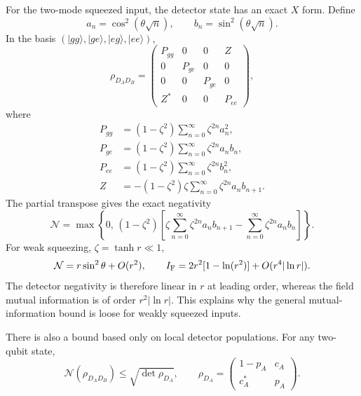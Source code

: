 \documentclass[pdflatex,sn-mathphys-num]{sn-jnl}
\begin{document}
For the two-mode squeezed input, the detector state has an exact $X$ form. Define
\begin{equation}
a_n=\cos^2(\theta\sqrt n),\qquad b_n=\sin^2(\theta\sqrt n).
\label{eq:jc-ab-definitions}
\end{equation}
In the basis $(|gg\rangle,|ge\rangle,|eg\rangle,|ee\rangle)$,
\begin{equation}
\rho_{D_AD_B}=
\begin{pmatrix}
P_{gg}&0&0&Z\\
0&P_{ge}&0&0\\
0&0&P_{ge}&0\\
Z^*&0&0&P_{ee}
\end{pmatrix},
\label{eq:tmsv-jc-x-state}
\end{equation}
where
\begin{align}
P_{gg}&=(1-\zeta^2)\sum_{n=0}^{\infty}\zeta^{2n}a_n^2,\nonumber\\
P_{ge}&=(1-\zeta^2)\sum_{n=0}^{\infty}\zeta^{2n}a_nb_n,\nonumber\\
P_{ee}&=(1-\zeta^2)\sum_{n=0}^{\infty}\zeta^{2n}b_n^2,\label{eq:tmsv-jc-x-populations}\\
Z&=-(1-\zeta^2)\zeta\sum_{n=0}^{\infty}\zeta^{2n}a_nb_{n+1}.\nonumber
\end{align}
The partial transpose gives the exact negativity
\begin{equation}
\mathcal N=
\max\left\{0,\,
(1-\zeta^2)\left[
\zeta\sum_{n=0}^{\infty}\zeta^{2n}a_nb_{n+1}
-\sum_{n=0}^{\infty}\zeta^{2n}a_nb_n
\right]\right\}.
\label{eq:tmsv-jc-exact-negativity}
\end{equation}
For weak squeezing, $\zeta=\tanh r\ll1$,
\begin{equation}
\mathcal N=r\sin^2\theta+O(r^2),
\qquad
I_{\rm F}=2r^2[1-\ln(r^2)]+O(r^4|\ln r|).
\label{eq:jc-weak-squeezing}
\end{equation}
The detector negativity is therefore linear in $r$ at leading order, whereas the field mutual information is of order $r^2|\ln r|$. This explains why the general mutual-information bound is loose for weakly squeezed inputs.

There is also a bound based only on local detector populations. For any two-qubit state,
\begin{equation}
\mathcal N(\rho_{D_AD_B})\leq\sqrt{\det\rho_{D_A}},
\qquad
\rho_{D_A}=
\begin{pmatrix}1-p_A&c_A\\c_A^*&p_A\end{pmatrix}.
\label{eq:negativity-local-determinant-bound}
\end{equation}
\end{document}

